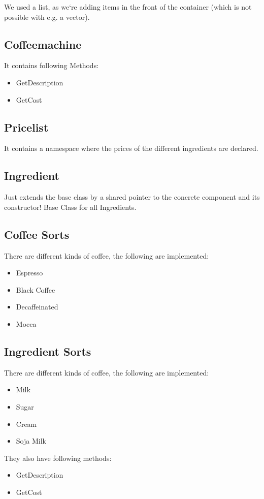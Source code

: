 We used a list, as we`re adding items in the front of the container (which is not possible with e.g. a vector).

\subsection{Coffeemachine}
It contains following Methods:
\begin{itemize}
	\item GetDescription
	\item GetCost
\end{itemize}

\subsection{Pricelist}
It contains a namespace where the prices of the different ingredients are declared.

\subsection{Ingredient}
Just extends the base class by a shared pointer to the concrete component and its constructor! Base Class for all Ingredients.

\subsection{Coffee Sorts}
There are different kinds of coffee, the following are implemented:
\begin{itemize}
	\item Espresso
	\item Black Coffee
	\item Decaffeinated
	\item Mocca
\end{itemize}

\subsection{Ingredient Sorts}
There are different kinds of coffee, the following are implemented:
\begin{itemize}
	\item Milk
	\item Sugar
	\item Cream
	\item Soja Milk
\end{itemize}

They also have following methods:
\begin{itemize}
	\item GetDescription
	\item GetCost
\end{itemize}

